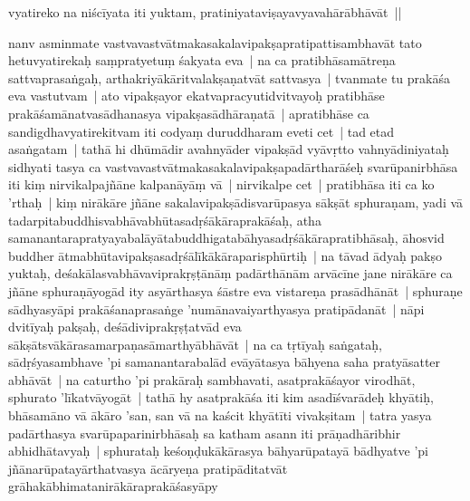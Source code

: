 \documentclass[article,12pt,a4paper]{memoir}%
\newcounter{parCount}
\begin{document}
vyatire\label{capv-np-4a-start}ko na niścīyata iti yuktam, pratiniyataviṣayavyavahārābhāvāt ||
	{}
	\pend%
      

	  \pstart \leavevmode%
	\label{thakur75-131.13}nanv asminmate vastvavastvātmakasakalavipakṣapratipattisambhavāt tato hetuvyatirekaḥ saṃpratyetuṃ śakyata eva | na ca pratibhāsamātreṇa sattvaprasaṅgaḥ, arthakriyākāritvalakṣaṇatvāt sattvasya | tvanmate tu prakāśa eva vastutvam | ato vipakṣayor ekatvapracyu\label{ratnakīrtinibandhāvali__36r1PF7IMSLXLPJA0LN21NP81M7}tidvi\label{ratnakīrtinibandhāvali__36r1PF7IMSJYGHJZ8T01KRVE74E}tvayoḥ pratibhāse prakāśamānatvasādhanasya vipakṣasādhāraṇatā | apratibhāse ca sandigdhavyatirekitvam iti codyaṃ duruddharam eveti cet | tad etad asaṅgatam | tathā hi dhūmādir avahnyāder vipakṣād vyāvṛtto vahnyādiniyataḥ sidhyati tasya ca vastvavastvātmakasakalavipakṣapadārtharāśeḥ svarūpanirbhāsa iti kiṃ nirvikalpajñāne kalpanāyāṃ vā | nirvikalpe cet | pratibhāsa iti ca ko 'rthaḥ | kiṃ nirākāre jñāne sakalavipakṣādisvarūpasya sākṣāt sphuraṇam, yadi vā tadarpitabuddhisvabhāvabhūtasadṛśākāraprakāśaḥ, atha samanantarapratyayabalāyātabuddhigatabāhyasadṛśākārapratibhāsaḥ, āhosvid buddher ātmabhūtavipakṣasadṛśālīkākāraparisphūrtiḥ | \label{thakur75-131.24} na tāvad ādyaḥ pakṣo yuktaḥ, deśakā\label{capv-np-4a-end}\label{capv-np-4b-start}lasvabhāvaviprakṛṣṭānāṃ padārthānām arvācīne jane nirākāre ca jñāne sphuraṇāyogād ity asyārthasya śāstre eva vistareṇa prasādhānāt | sphuraṇe sādhyasyāpi prakāśanaprasaṅge 'numānavaiyarthyasya pratipādanāt | \label{thakur75-131.27} nāpi dvitīyaḥ pakṣaḥ, deśādiviprakṛṣṭatvād eva sākṣātsvākārasamarpaṇasāmarthyābhāvāt | \label{thakur75-131.29} na ca tṛtīyaḥ saṅgataḥ, sādṛśyasambhave 'pi samanantarabalād evāyātasya bāhyena saha pratyāsatter abhāvāt | \label{thakur75-131.31} na caturtho 'pi prakāraḥ sambhavati, asatprakāśayor virodhāt, sphurato 'līkatvāyogāt | tathā hy asatprakāśa iti kim asadīśvarādeḥ khyātiḥ, bhāsamāno vā ākāro 'san, san vā na kaścit khyātīti vivakṣitam | tatra yasya padārthasya svarūpaparinirbhāsaḥ sa katham asann iti prāṇadhāribhir abhidhātavyaḥ | sphurataḥ keśoṇḍukākārasya bāhyarūpatayā bādhyatve 'pi jñānarūpatayārthatvasya ācāryeṇa pratipāditatvāt grāhakābhimatanirākāraprakāśasyāpy 
\end{document}
